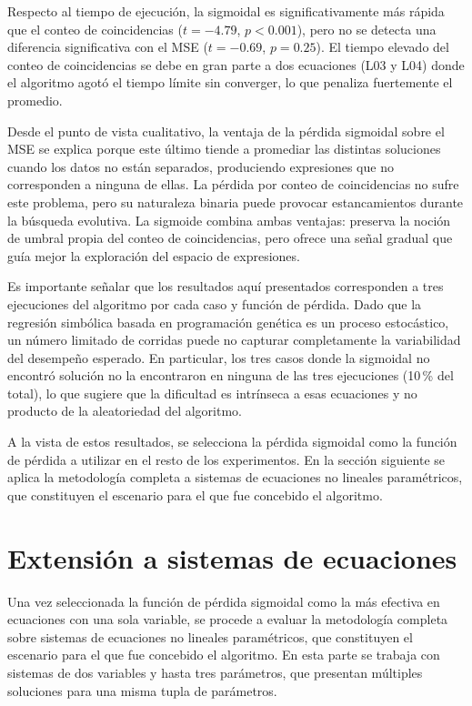 Respecto al tiempo de ejecución, la sigmoidal es significativamente más rápida que el conteo de coincidencias ($t = -4.79$, $p < 0.001$), pero no se detecta una diferencia significativa con el MSE ($t = -0.69$, $p = 0.25$). El tiempo elevado del conteo de coincidencias se debe en gran parte a dos ecuaciones (L03 y L04) donde el algoritmo agotó el tiempo límite sin converger, lo que penaliza fuertemente el promedio.

Desde el punto de vista cualitativo, la ventaja de la pérdida sigmoidal sobre el MSE se explica porque este último tiende a promediar las distintas soluciones cuando los datos no están separados, produciendo expresiones que no corresponden a ninguna de ellas. La pérdida por conteo de coincidencias no sufre este problema, pero su naturaleza binaria puede provocar estancamientos durante la búsqueda evolutiva. La sigmoide combina ambas ventajas: preserva la noción de umbral propia del conteo de coincidencias, pero ofrece una señal gradual que guía mejor la exploración del espacio de expresiones.

Es importante señalar que los resultados aquí presentados corresponden a tres ejecuciones del algoritmo por cada caso y función de pérdida. Dado que la regresión simbólica basada en programación genética es un proceso estocástico, un número limitado de corridas puede no capturar completamente la variabilidad del desempeño esperado. En particular, los tres casos donde la sigmoidal no encontró solución no la encontraron en ninguna de las tres ejecuciones (10\,\% del total), lo que sugiere que la dificultad es intrínseca a esas ecuaciones y no producto de la aleatoriedad del algoritmo.

A la vista de estos resultados, se selecciona la pérdida sigmoidal como la función de pérdida a utilizar en el resto de los experimentos. En la sección siguiente se aplica la metodología completa a sistemas de ecuaciones no lineales paramétricos, que constituyen el escenario para el que fue concebido el algoritmo.

\section{Extensión a sistemas de ecuaciones} \label{sec:fase2}

Una vez seleccionada la función de pérdida sigmoidal como la más efectiva en ecuaciones con una sola variable, se procede a evaluar la metodología completa sobre sistemas de ecuaciones no lineales paramétricos, que constituyen el escenario para el que fue concebido el algoritmo. En esta parte se trabaja con sistemas de dos variables y hasta tres parámetros, que presentan múltiples soluciones para una misma tupla de parámetros.

